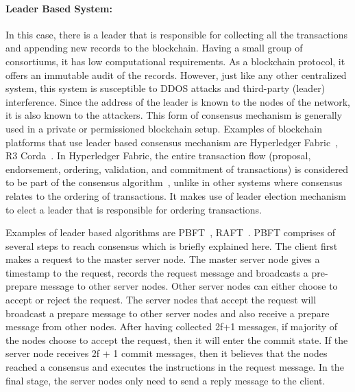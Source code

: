 \paragraph{Leader Based System:}In this case, there is a leader that is
responsible for collecting all the transactions and appending new records to
the blockchain. Having a small group of consortiums, it has low computational
requirements. As a blockchain protocol, it offers an immutable audit of the
records. However, just like any other centralized system, this system is
susceptible to DDOS attacks and third-party (leader) interference. Since the
address of the leader is known to the nodes of the network, it is also known to
the attackers. This form of consensus mechanism is generally used in a private
or permissioned blockchain setup. Examples of blockchain platforms that use
leader based consensus mechanism are Hyperledger
Fabric~\cite{androulaki2018hyperledger}, R3 Corda~\cite{brown2016corda}. In
Hyperledger Fabric, the entire transaction flow (proposal, endorsement,
ordering, validation, and commitment of transactions) is considered to be part
of the consensus algorithm~\cite{hyperledgerfabric,hyperledgerfabric2}, unlike
in other systems where consensus relates to the ordering of transactions. It
makes use of leader election mechanism to elect a leader that is responsible
for ordering transactions. \par
Examples of leader based algorithms are \ac{PBFT}~\cite{castro1999practical},
RAFT~\cite{ongaro2014search}. \ac{PBFT} comprises of several steps to reach
consensus which is briefly explained here. The client first makes a request to
the master server node. The master server node gives a timestamp to the
request, records the request message and broadcasts a pre-prepare message to
other server nodes. Other server nodes can either choose to accept or reject
the request. The server nodes that accept the request will broadcast a prepare
message to other server nodes and also receive a prepare message from other
nodes. After having collected 2f+1 messages, if majority of the nodes choose to
accept the request, then it will enter the commit state. If the server node
receives 2f + 1 commit messages, then it believes that the nodes reached a
consensus and executes the instructions in the request message. In the final
stage, the server nodes only need to send a reply message to the client.
